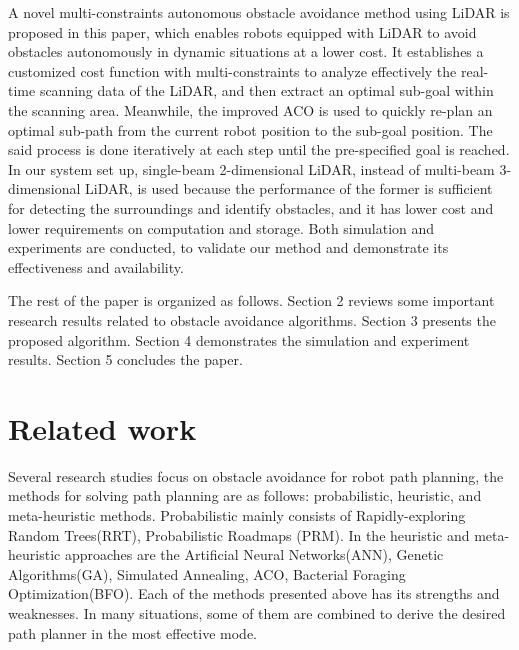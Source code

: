 \documentclass{iosart2c}
\begin{document}
A novel multi-constraints autonomous obstacle avoidance method using LiDAR is proposed in this paper, which enables robots equipped with LiDAR to avoid obstacles autonomously in dynamic situations at a lower cost. It establishes a customized cost function with multi-constraints to analyze effectively the real-time scanning data of the LiDAR, and then extract an optimal sub-goal within the scanning area. Meanwhile, the improved ACO is used to quickly re-plan an optimal sub-path from the current robot position to the sub-goal position. The said process is done iteratively at each step until the pre-specified goal is reached. In our system set up, single-beam 2-dimensional LiDAR, instead of multi-beam 3-dimensional LiDAR, is used because the performance of the former is sufficient for detecting the surroundings and identify obstacles, and it has lower cost and lower requirements on computation and storage. Both simulation and experiments are conducted, to validate our method and demonstrate its effectiveness and availability.

The rest of the paper is organized as follows. Section 2 reviews some important research results related to obstacle avoidance algorithms. Section 3 presents the proposed algorithm. Section 4 demonstrates the simulation and experiment results. Section 5 concludes the paper.


\section{Related work}\label{s2}
Several research studies focus on obstacle avoidance for robot path planning\cite{4}, the methods for solving path planning are as follows: probabilistic, heuristic, and meta-heuristic methods. Probabilistic mainly consists of Rapidly-exploring Random Trees(RRT)\cite{5}, Probabilistic Roadmaps (PRM)\cite{6}. In the heuristic and meta-heuristic approaches are the Artificial Neural Networks(ANN)\cite{7}, Genetic Algorithms(GA)\cite{8}, Simulated Annealing\cite{9}, ACO\cite{10}, Bacterial Foraging Optimization(BFO)\cite{11}. Each of the methods presented above has its strengths and weaknesses. In many situations, some of them are combined to derive the desired path planner in the most effective mode\cite{12,13}. 
\end{document}
